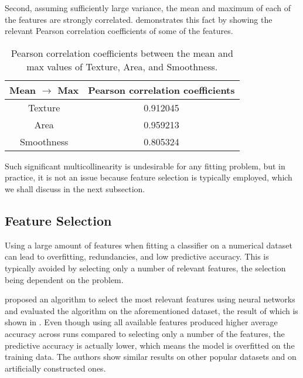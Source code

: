 \documentclass[twocolumn]{article}
\begin{document}
Second, assuming sufficiently large variance, the mean and maximum of each of
the features are strongly correlated. 
demonstrates this fact by showing the relevant Pearson correlation coefficients
of some of the features.

\begin{table}
\begin{center}
\begin{tabular}{cc}
\toprule
Mean $\rightarrow$ Max & Pearson correlation coefficients \\
\midrule
Texture & 0.912045 \\
Area & 0.959213 \\
Smoothness & 0.805324 \\
\bottomrule
\end{tabular}
\end{center}
\caption{Pearson correlation coefficients between the mean and max values of
  Texture, Area, and Smoothness.}
\label{tab:MeanMaxCorrelation}
\end{table}

Such significant multicollinearity is undesirable for any fitting problem, but
in practice, it is not an issue because feature selection is typically employed,
which we shall discuss in the next subsection.

\subsection{Feature Selection}

Using a large amount of features when fitting a classifier on a numerical
dataset can lead to overfitting, redundancies, and low predictive accuracy. This
is typically avoided by selecting only a number of relevant features, the
selection being dependent on the problem.

\autocite{Setiono1997} proposed an algorithm to select the most relevant
features using neural networks and evaluated the algorithm on the aforementioned
dataset, the result of which is shown in .
Even though using all available features produced higher average accuracy across
runs compared to selecting only a number of the features, the predictive
accuracy is actually lower, which means the model is overfitted on the training
data. The authors show similar results on other popular datasets and on
artificially constructed ones.
\end{document}

